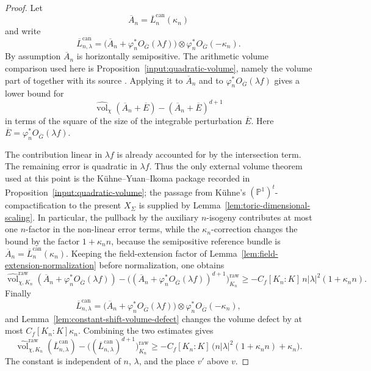 \documentclass[10pt,a4paper]{amsart}
\theoremstyle{plain}
\theoremstyle{plain}
\numberwithin{equation}{section}
\providecommand{\ol}{\overline}
\providecommand{\can}{\operatorname{can}}
\providecommand{\widevol}{\widehat{\operatorname{vol}}_{\chi}}
\begin{document}
\begin{proof}
	Let
	\[
	\ol A_n=\ol L_n^{\can}(\kappa_n)
	\]
	and write
	\[
	\ol L_{n,\lambda}^{\can}
	=
	\bigl(\ol A_n+\varphi_n^*O_{\ol G}(\lambda f)\bigr)
	\otimes\varphi_n^*O_{\ol G}(-\kappa_n).
	\]
	By assumption \(\ol A_n\) is horizontally semipositive.  The arithmetic volume
	comparison used here is Proposition~\ref{input:quadratic-volume}, namely the volume
	part of \cite[Lemma~4.6]{Ku1} together with its source
	\cite[Lemma~2.6]{Ku1}.  Applying it to \(\ol A_n\) and to
	\(\varphi_n^*O_{\ol G}(\lambda f)\)
	gives a lower bound for
	\[
	\widevol(\ol A_n+\ol E)-(\ol A_n+\ol E)^{d+1}
	\]
	in terms of the square of the size of the integrable perturbation \(\ol E\).
	Here \(\ol E=\varphi_n^*O_{\ol G}(\lambda f)\).
	
	The contribution linear in \(\lambda f\) is already accounted for by the
	intersection term.  The remaining error is quadratic in \(\lambda f\).  Thus
	the only external volume theorem used at this point is the
	K\"uhne--Yuan--Ikoma package recorded in
	Proposition~\ref{input:quadratic-volume}; the passage from K\"uhne's
	\((\mathbb P^1)^t\)-compactification to the present \(X_\Sigma\) is supplied
	by Lemma~\ref{lem:toric-dimensional-scaling}.  In particular, the pullback by
	the auxiliary \(n\)-isogeny contributes at most one \(n\)-factor in the
	non-linear error terms, while the \(\kappa_n\)-correction changes the bound by
	the factor \(1+\kappa_n n\), because the semipositive reference bundle is
	\(\ol A_n=\ol L_n^{\can}(\kappa_n)\).  Keeping the field-extension factor
	of Lemma~\ref{lem:field-extension-normalization} before normalization, one
	obtains
	\[
	\widehat{\operatorname{vol}}_{\chi,K_n}^{\mathrm{raw}}
	(\ol A_n+\varphi_n^*O_{\ol G}(\lambda f))
	-\bigl((\ol A_n+\varphi_n^*O_{\ol G}(\lambda f))^{d+1}
	\bigr)^{\mathrm{raw}}_{K_n}
	\ge
	-C_f [K_n:K]\, n|\lambda|^2(1+\kappa_n n).
	\]
	Finally
	\[
	\ol L_{n,\lambda}^{\can}
	=
	\bigl(\ol A_n+\varphi_n^*O_{\ol G}(\lambda f)\bigr)
	\otimes\varphi_n^*O_{\ol G}(-\kappa_n),
	\]
	and Lemma~\ref{lem:constant-shift-volume-defect} changes the volume defect by
	at most \(C_f[K_n:K]\kappa_n\).  Combining the two estimates gives
	\[
	\widehat{\operatorname{vol}}_{\chi,K_n}^{\mathrm{raw}}(\ol L_{n,\lambda}^{\can})
	-\bigl((\ol L_{n,\lambda}^{\can})^{d+1}\bigr)^{\mathrm{raw}}_{K_n}
	\ge
	-C_f [K_n:K]\,
	\bigl(n|\lambda|^2(1+\kappa_n n)+\kappa_n\bigr).
	\]
	The constant is independent of \(n\), \(\lambda\), and the place \(v'\) above
	\(v\).
\end{proof}
\end{document}
